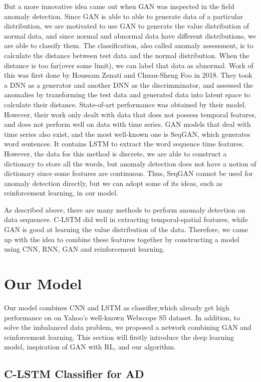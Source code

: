 \documentclass{acmtog} %
\begin{document}
But a more innovative idea came out when GAN was inspected in the field anomaly detection. Since GAN is able to able to generate data of a particular distribution, we are motivated to use GAN to generate the value distribution of normal data, and since normal and abnormal data have different distributions, we are able to classify them. The classification, also called anomaly assessment, is to calculate the distance between test data and the normal distribution. When the distance is too far(over some limit), we can label that data as abnormal. Work of this was first done by Houssam Zenati and Chuan-Sheng Foo in 2018\cite{bibitem1}. They took a DNN as a generator and another DNN as the discrimminator, and assessed the anomalies by transforming the test data and generated data into latent space to calculate their distance. State-of-art performance was obtained by their model. However, their work only dealt with data that does not possess temporal features, and does not perform well on data with time series. GAN models that deal with time series also exist, and the most well-known one is SeqGAN, which generates word sentences. It contains LSTM to extract the word sequence time features. However, the data for this method is discrete, we are able to construct a dictionary to store all the words, but anomaly detection does not have a notion of dictionary since some features are continuous. Thus, SeqGAN cannot be used for anomaly detection directly, but we can adopt some of its ideas, such as reinforcement learning, in our model.

As described above, there are many methods to perform anomaly detection on data sequences. C-LSTM did well in extracting temporal-spatial features, while GAN is good at learning the value distribution of the data. Therefore, we came up with the idea to combine these features together by constructing a model using CNN, RNN, GAN and reinforcement learning.


\section{Our Model}
Our model combines CNN and LSTM as classifier,which already get high performance on on Yahoo’s well-known Webscope S5 dataset. In addition, to solve the imbalanced data problem, we proposed a network combining GAN and reinforcement learning. This section will firstly introduce the deep learning model, inspiration of GAN with RL, and our algorithm.

\subsection{C-LSTM Classifier for AD}
\end{document}
